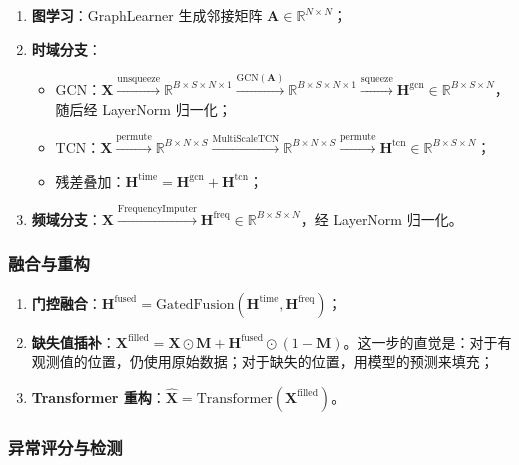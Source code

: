 \documentclass[UTF8]{ctexart}
\begin{document}
\begin{enumerate}
    \item \textbf{图学习}：GraphLearner 生成邻接矩阵 $\mathbf{A} \in \mathbb{R}^{N \times N}$；
    \item \textbf{时域分支}：
    \begin{itemize}
        \item GCN：$\mathbf{X} \xrightarrow{\text{unsqueeze}} \mathbb{R}^{B \times S \times N \times 1} \xrightarrow{\text{GCN}(\mathbf{A})} \mathbb{R}^{B \times S \times N \times 1} \xrightarrow{\text{squeeze}} \mathbf{H}^{\text{gcn}} \in \mathbb{R}^{B \times S \times N}$，随后经 LayerNorm 归一化；
        \item TCN：$\mathbf{X} \xrightarrow{\text{permute}} \mathbb{R}^{B \times N \times S} \xrightarrow{\text{MultiScaleTCN}} \mathbb{R}^{B \times N \times S} \xrightarrow{\text{permute}} \mathbf{H}^{\text{tcn}} \in \mathbb{R}^{B \times S \times N}$；
        \item 残差叠加：$\mathbf{H}^{\text{time}} = \mathbf{H}^{\text{gcn}} + \mathbf{H}^{\text{tcn}}$；
    \end{itemize}
    \item \textbf{频域分支}：$\mathbf{X} \xrightarrow{\text{FrequencyImputer}} \mathbf{H}^{\text{freq}} \in \mathbb{R}^{B \times S \times N}$，经 LayerNorm 归一化。
\end{enumerate}

\subsubsection{融合与重构}

\begin{enumerate}
    \item \textbf{门控融合}：$\mathbf{H}^{\text{fused}} = \mathrm{GatedFusion}(\mathbf{H}^{\text{time}}, \mathbf{H}^{\text{freq}})$；
    \item \textbf{缺失值插补}：$\mathbf{X}^{\text{filled}} = \mathbf{X} \odot \mathbf{M} + \mathbf{H}^{\text{fused}} \odot (1 - \mathbf{M})$。这一步的直觉是：对于有观测值的位置，仍使用原始数据；对于缺失的位置，用模型的预测来填充；
    \item \textbf{Transformer 重构}：$\hat{\mathbf{X}} = \mathrm{Transformer}(\mathbf{X}^{\text{filled}})$。
\end{enumerate}

\subsubsection{异常评分与检测}
\end{document}
